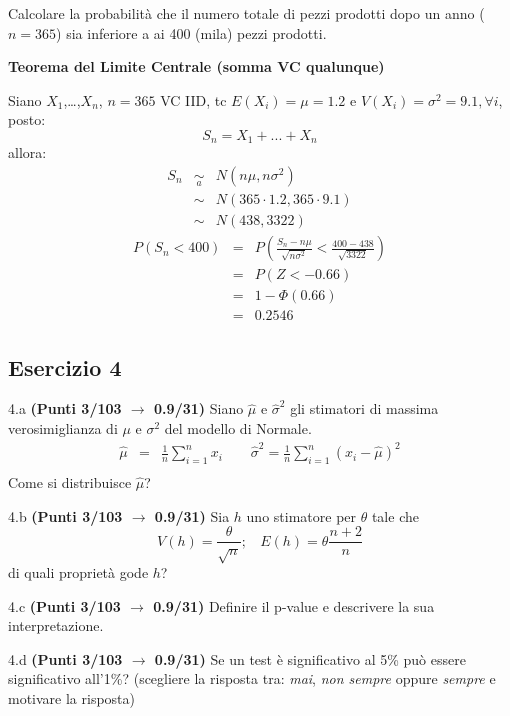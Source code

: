 \documentclass[
  11pt,
]{book}
\theoremstyle{mytheoremstyle}
\theoremstyle{mydefstyle}
\newenvironment{sol}
  {
  \begin{tcolorbox}[enhanced,breakable,arc=0.1mm,boxrule=1pt,colback=white,colframe=iblue,
  title=\bf \fontfamily{lmss}\selectfont \hspace{.5 cm} Soluzione,drop fuzzy shadow]

}{
\end{tcolorbox}
  }
\begin{document}
Calcolare la probabilità che il numero totale di pezzi prodotti dopo un anno (\(n=365\)) sia inferiore a ai 400 (mila) pezzi prodotti.

\begin{sol}
\textbf{Teorema del Limite Centrale (somma VC qualunque)}

Siano \(X_1\),\ldots,\(X_n\), \(n=365\) VC IID, tc \(E(X_i)=\mu=1.2\) e \(V(X_i)=\sigma^2=9.1,\forall i\), posto:
\[
      S_n = X_1 + ... + X_n
      \]
allora:\begin{eqnarray*}
  S_n & \mathop{\sim}\limits_{a}& N(n\mu,n\sigma^2) \\
     &\sim & N(365\cdot1.2,365\cdot9.1) \\
     &\sim & N(438,3322) 
  \end{eqnarray*}\begin{eqnarray*}
      P( S_n   <   400 ) 
        &=& P\left(  \frac { S_n  -  n\mu }{ \sqrt{n\sigma^2} }  <  \frac { 400  -  438 }{\sqrt{ 3322 }} \right)  \\
                 &=& P\left(  Z   <   -0.66 \right) \\    
                 &=&  1-\Phi( 0.66 ) \\ &=&  0.2546 
      \end{eqnarray*}

\end{sol}

\subsection{Esercizio 4}\label{esercizio-4-27}

4.a \textbf{(Punti 3/103 \(\rightarrow\) 0.9/31)} Siano \(\hat \mu\) e \(\hat\sigma^2\) gli stimatori di massima verosimiglianza di \(\mu\) e \(\sigma^2\) del modello di Normale.
\begin{eqnarray*}
  \hat\mu &=&  \frac 1n\sum_{i=1}^nx_i \qquad \hat\sigma^2 =  \frac 1n\sum_{i=1}^n(x_i-\hat\mu)^2\\
\end{eqnarray*}
Come si distribuisce \(\hat\mu\)?

4.b \textbf{(Punti 3/103 \(\rightarrow\) 0.9/31)} Sia \(h\) uno stimatore per \(\theta\) tale che
\[V(h)=\frac\theta {\sqrt{n}};~~~~E(h)=\theta\frac{n+2}{n}\]
di quali proprietà gode \(h\)?

4.c \textbf{(Punti 3/103 \(\rightarrow\) 0.9/31)} Definire il p-value e descrivere la sua interpretazione.

4.d \textbf{(Punti 3/103 \(\rightarrow\) 0.9/31)} Se un test è significativo al 5\% può essere significativo all'1\%? (scegliere la risposta tra: \emph{mai}, \emph{non sempre} oppure \emph{sempre} e motivare la risposta)
\end{document}
